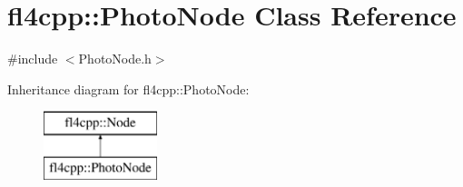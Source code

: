 \hypertarget{classfl4cpp_1_1_photo_node}{}\section{fl4cpp\+:\+:Photo\+Node Class Reference}
\label{classfl4cpp_1_1_photo_node}


{\ttfamily \#include $<$Photo\+Node.\+h$>$}

Inheritance diagram for fl4cpp\+:\+:Photo\+Node\+:\begin{figure}[H]
\begin{center}
\leavevmode
\includegraphics[height=2.000000cm]{classfl4cpp_1_1_photo_node}
\end{center}
\end{figure}

